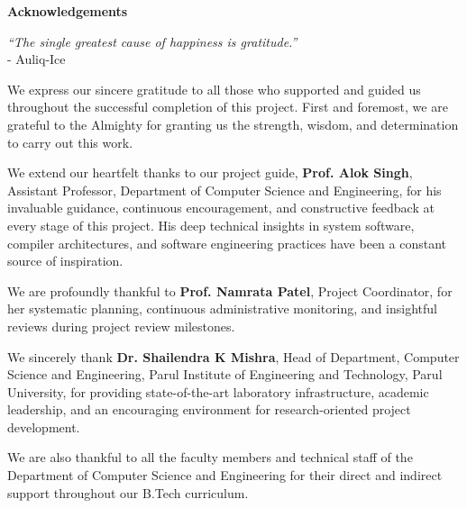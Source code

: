\thispagestyle{empty}
\newpage
\cleardoublepage{}
{}
\begin{center}
{\Large \bf Acknowledgements}\\
\end{center}
\vspace{10pt}
\begin{flushright}
\textit{“The single greatest cause of happiness is gratitude.” }\\
\vspace{5mm}
- Auliq-Ice
\end{flushright}

\vspace{5mm}
\noindent
We express our sincere gratitude to all those who supported and guided us throughout the successful completion of this project. First and foremost, we are grateful to the Almighty for granting us the strength, wisdom, and determination to carry out this work.

\vspace{3mm}
\noindent
We extend our heartfelt thanks to our project guide, \textbf{Prof. Alok Singh}, Assistant Professor, Department of Computer Science and Engineering, for his invaluable guidance, continuous encouragement, and constructive feedback at every stage of this project. His deep technical insights in system software, compiler architectures, and software engineering practices have been a constant source of inspiration.

\vspace{3mm}
\noindent
We are profoundly thankful to \textbf{Prof. Namrata Patel}, Project Coordinator, for her systematic planning, continuous administrative monitoring, and insightful reviews during project review milestones.

\vspace{3mm}
\noindent
We sincerely thank \textbf{Dr. Shailendra K Mishra}, Head of Department, Computer Science and Engineering, Parul Institute of Engineering and Technology, Parul University, for providing state-of-the-art laboratory infrastructure, academic leadership, and an encouraging environment for research-oriented project development.

\vspace{3mm}
\noindent
We are also thankful to all the faculty members and technical staff of the Department of Computer Science and Engineering for their direct and indirect support throughout our B.Tech curriculum.

